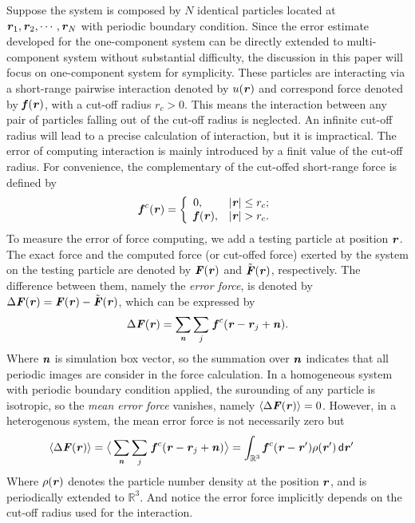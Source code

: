 \documentclass[aps,pre,preprint]{revtex4}
\renewcommand{\v}[1]{\textbf{\textit{#1}}}
\renewcommand{\d}[1]{\textsf{#1}}
\begin{document}
Suppose the system is composed by $N$ identical particles located at
$\v r_1, \v r_2, \cdots, \v r_N$ with periodic boundary condition.
Since the error estimate developed for the one-component system can be
directly extended to multi-component system without substantial
difficulty, the discussion in this paper will focus on one-component
system for symplicity.  These particles are interacting via a
short-range pairwise interaction denoted by $u(\v r)$ and correspond
force denoted by $\v f(\v r)$, with a cut-off radius $r_c > 0$.  This
means the interaction between any pair of particles falling out of the
cut-off radius is neglected.  An infinite cut-off radius will lead to
a precise calculation of interaction, but it is impractical.  The
error of computing interaction is mainly introduced by a finit value
of the cut-off radius. For convenience, the complementary of the
cut-offed short-range force is defined by
\begin{align}
  \v f^c(\v r) =
  \left\{
  \begin{array}{ll}
    0, & \vert\v r\vert\leq r_c; \\
    \v f(\v r), & \vert\v r\vert > r_c.
  \end{array}
  \right.
\end{align}
To measure the error of force computing, we add a testing particle at
position $\v r$. The exact force and the computed force (or cut-offed
force) exerted by the system on the testing particle are denoted by
${\v F}(\v r)$ and $\tilde{\v F}(\v r)$, respectively.  The difference
between them, namely the \emph{error force}, is denoted by $\Delta\v
F(\v r) = \v F(\v r) - \tilde{\v F}(\v r)$, which can be expressed by
\begin{align}
  \Delta\v F(\v r) = \sum_{\v n}\sum_{j}\, \v f^c(\v r - \v r_j + \v n).
\end{align}
Where $\v n$ is simulation box vector, so the summation over $\v n$
indicates that all periodic images are consider in the force
calculation. In a homogeneous system with periodic boundary condition
applied, the surounding of any particle is isotropic, so the
\emph{mean error force} vanishes, namely $\langle\Delta\v F(\v
r)\rangle = 0$. However, in a heterogenous system, the mean error
force is not necessarily zero but
\begin{align} \label{eqn:tmp3} %
  \langle\Delta\v F(\v r)\rangle
  &=
  \big\langle
  \sum_{\v n}\sum_{j}\, \v f^c(\v r - \v r_j + \v n)
  \big\rangle 
  =
  \int_{\mathbb R^3}\v f^c(\v r - \v r')\rho(\v r')\,\d d\v r'
\end{align}
Where $\rho(\v r)$ denotes the particle number density at the position
$\v r$, and is periodically extended to $\mathbb R^3$. And notice the
error force implicitly depends on the cut-off radius used for the
interaction.
\end{document}

